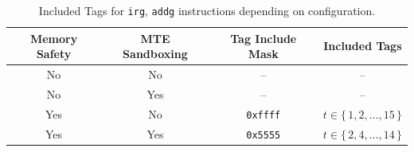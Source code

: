 \begin{table}
  \centering
  \begin{tabular}{c | c || c | c}
    \textbf{Memory Safety} & \textbf{MTE Sandboxing} & \textbf{Tag Include Mask} & \textbf{Included Tags} \\
    \hline
    No  & No  & -- & -- \\
    No  & Yes & -- & -- \\
    Yes & No  & \texttt{0xffff} & $t \in \{\,1, 2, \dots, 15\,\}$ \\
    Yes & Yes & \texttt{0x5555} & $t \in \{\,2, 4, \dots, 14\,\}$
  \end{tabular}
  \caption{Included Tags for \texttt{irg}, \texttt{addg} instructions depending on configuration.}
  \label{tab:tag-include-mask}
\end{table}

